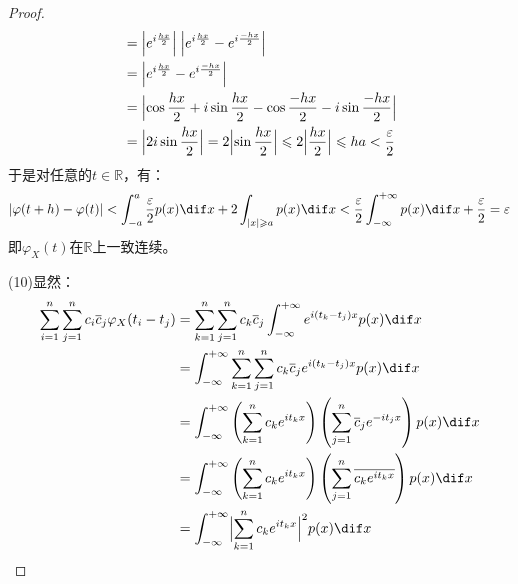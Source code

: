 \begin{proof}
\begin{align*}
		&=\Bigl|e^{i\frac{hx}{2}}\Bigr|\;\Bigl|e^{i\frac{hx}{2}}-e^{i\frac{-hx}{2}}\Bigr| \\
		&=\Bigl|e^{i\frac{hx}{2}}-e^{i\frac{-hx}{2}}\Bigr| \\
		&=\Bigl|\cos\frac{hx}{2}+i\sin\frac{hx}{2}-\cos\frac{-hx}{2}-i\sin\frac{-hx}{2}\Bigr| \\
		&=\Bigl|2i\sin\frac{hx}{2}\Bigr|
		=2\Bigl|\sin\frac{hx}{2}\Bigr|\leqslant2\Bigl|\frac{hx}{2}\Bigr|\leqslant ha<\frac{\varepsilon}{2}
	\end{align*}
	于是对任意的$t\in\mathbb{R}$，有：
	\begin{equation*}
		|\varphi(t+h)-\varphi(t)|<\int_{-a}^{a}\frac{\varepsilon}{2}p(x)\dif x+2\int_{|x|\geqslant a}p(x)\dif x<\frac{\varepsilon}{2}\int_{-\infty}^{+\infty}p(x)\dif x+\frac{\varepsilon}{2}=\varepsilon
	\end{equation*}
	即$\varphi_X(t)$在$\mathbb{R}$上一致连续。\par
	(10)显然：
	\begin{align*}
		\sum_{i=1}^{n}\sum_{j=1}^{n}c_i\overline{c}_j\varphi_X(t_i-t_j)
		&=\sum_{k=1}^{n}\sum_{j=1}^{n}c_k\overline{c}_j\int_{-\infty}^{+\infty}e^{i(t_k-t_j)x}p(x)\dif x \\
		&=\int_{-\infty}^{+\infty}\sum_{k=1}^{n}\sum_{j=1}^{n}c_k\overline{c}_je^{i(t_k-t_j)x}p(x)\dif x \\
		&=\int_{-\infty}^{+\infty}\left(\sum_{k=1}^{n}c_ke^{it_kx}\right)\left(\sum_{j=1}^{n}\overline{c}_je^{-it_jx}\right)p(x) \dif x \\
		&=\int_{-\infty}^{+\infty}\left(\sum_{k=1}^{n}c_ke^{it_kx}\right)\left(\sum_{j=1}^{n}\overline{c_ke^{it_kx}}\right)p(x) \dif x \\
		&=\int_{-\infty}^{+\infty}\Bigl|\sum_{k=1}^{n}c_ke^{it_kx}\Bigr|^2p(x) \dif x\qedhere
	\end{align*}
\end{proof}